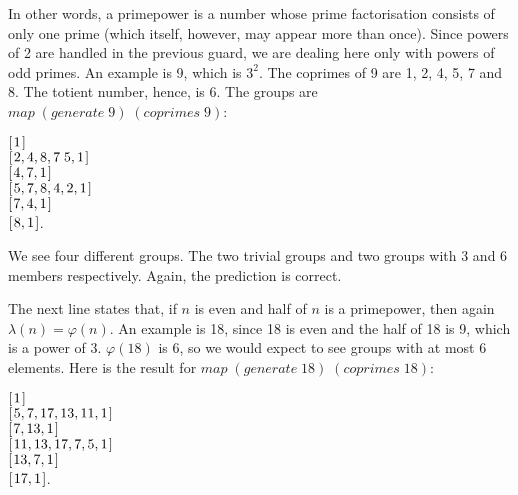 \documentclass[tikz]{scrreprt}
\newcommand{\Varid}[1]{\mathit{#1}}
\begin{document}
In other words, a primepower is a number
whose prime factorisation consists of only
one prime (which itself, however, may appear more than once).
Since powers of 2 are handled in the previous guard,
we are dealing here only with powers of odd primes.
An example is 9, which is $3^2$.
The coprimes of 9 are 1, 2, 4, 5, 7 and 8.
The totient number, hence, is 6.
The groups are \ensuremath{\Varid{map}\;(\Varid{generate}\;\mathrm{9})\;(\Varid{coprimes}\;\mathrm{9})}:

\begin{minipage}{\textwidth}
\ensuremath{[\mskip1.5mu \mathrm{1}\mskip1.5mu]}\\
\ensuremath{[\mskip1.5mu \mathrm{2},\mathrm{4},\mathrm{8},\mathrm{7}\;\mathrm{5},\mathrm{1}\mskip1.5mu]}\\
\ensuremath{[\mskip1.5mu \mathrm{4},\mathrm{7},\mathrm{1}\mskip1.5mu]}\\
\ensuremath{[\mskip1.5mu \mathrm{5},\mathrm{7},\mathrm{8},\mathrm{4},\mathrm{2},\mathrm{1}\mskip1.5mu]}\\
\ensuremath{[\mskip1.5mu \mathrm{7},\mathrm{4},\mathrm{1}\mskip1.5mu]}\\
\ensuremath{[\mskip1.5mu \mathrm{8},\mathrm{1}\mskip1.5mu]}.
\end{minipage}

We see four different groups.
The two trivial groups and two
groups with 3 and 6 members respectively.
Again, the prediction is correct.

The next line states that,
if $n$ is even and half of $n$
is a primepower, then again $\lambda(n) = \varphi(n)$.
An example is 18, since 18 is even and
the half of 18 is 9, which is a power of 3.
$\varphi(18)$ is 6, so we would expect to see
groups with at most 6 elements.
Here is the result for \ensuremath{\Varid{map}\;(\Varid{generate}\;\mathrm{18})\;(\Varid{coprimes}\;\mathrm{18})}:

\begin{minipage}{\textwidth}
\ensuremath{[\mskip1.5mu \mathrm{1}\mskip1.5mu]}\\
\ensuremath{[\mskip1.5mu \mathrm{5},\mathrm{7},\mathrm{17},\mathrm{13},\mathrm{11},\mathrm{1}\mskip1.5mu]}\\
\ensuremath{[\mskip1.5mu \mathrm{7},\mathrm{13},\mathrm{1}\mskip1.5mu]}\\
\ensuremath{[\mskip1.5mu \mathrm{11},\mathrm{13},\mathrm{17},\mathrm{7},\mathrm{5},\mathrm{1}\mskip1.5mu]}\\
\ensuremath{[\mskip1.5mu \mathrm{13},\mathrm{7},\mathrm{1}\mskip1.5mu]}\\
\ensuremath{[\mskip1.5mu \mathrm{17},\mathrm{1}\mskip1.5mu]}.
\end{minipage}
\end{document}
